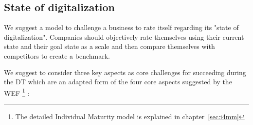 \subsection{State of digitalization}
We suggest a model to challenge a business to rate itself regarding its "state of digitalization". Companies should objectively rate themselves using their current state and their goal state as a scale and then compare themselves with competitors to create a benchmark. 


We suggest to consider three key aspects as core challenges for succeeding during the \ac{DT} which are an adapted form of the four core aspects suggested by the \ac{WEF}
\footnote{The detailed Individual Maturity model is explained in chapter~\ref{sec:i4mm}}
\cite{worldforumdigitalenterprise:2016}:



